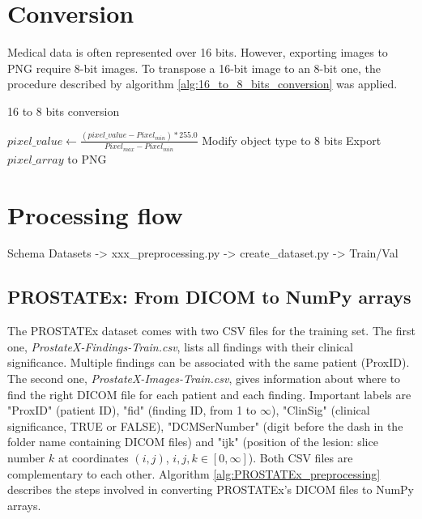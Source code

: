 \section{Conversion}

Medical data is often represented over 16 bits. However, exporting images to PNG require 8-bit images. To transpose a 16-bit image to an 8-bit one, the procedure described by algorithm \ref{alg:16_to_8_bits_conversion} was applied.

\begin{algorithm}
    \caption{16 to 8 bits conversion}
    \label{alg:16_to_8_bits_conversion}
    \begin{algorithmic}[1] %
        			\State $pixel\_value \gets \frac{(pixel\_value - Pixel_{min}) * 255.0}{Pixel_{max} - Pixel_{min}}$
        		\EndFor
        		\State Modify object type to 8 bits
        		\State Export $pixel\_array$ to PNG
        \EndProcedure
    \end{algorithmic}
\end{algorithm}


\section{Processing flow}

Schema Datasets -> xxx\_preprocessing.py -> create\_dataset.py -> Train/Val


\subsection{PROSTATEx: From DICOM to NumPy arrays}

The PROSTATEx dataset comes with two CSV files for the training set. The first one, \textit{ProstateX-Findings-Train.csv}, lists all findings with their clinical significance. Multiple findings can be associated with the same patient (ProxID). The second one, \textit{ProstateX-Images-Train.csv}, gives information about where to find the right DICOM file for each patient and each finding. Important labels are "ProxID" (patient ID), "fid" (finding ID, from 1 to $\infty$), "ClinSig" (clinical significance, TRUE or FALSE), "DCMSerNumber" (digit before the dash in the folder name containing DICOM files) and "ijk" (position of the lesion: slice number $k$ at coordinates $(i,j)$, $i,j,k \in [0,\infty]$). Both CSV files are complementary to each other. Algorithm \ref{alg:PROSTATEx_preprocessing} describes the steps involved in converting PROSTATEx's DICOM files to NumPy arrays. 

